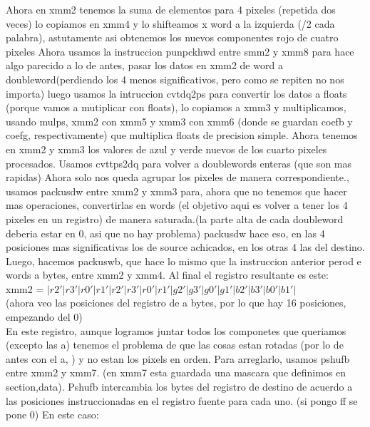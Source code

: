 \documentclass[a4paper]{article}
\begin{document}
   Ahora en xmm2 tenemos la suma de elementos para 4 pixeles (repetida dos veces) lo copiamos en xmm4 y lo shifteamos x word a la izquierda (/2 cada palabra), astutamente asi obtenemos los nuevos componentes rojo de cuatro pixeles\hfill \break
   Ahora usamos la instruccion punpckhwd entre smm2 y xmm8 para hace algo parecido a lo de antes,  pasar los datos en xmm2 de word a doubleword(perdiendo los 4 menos significativos, pero como se repiten no nos importa) luego usamos la intruccion cvtdq2ps para convertir los datos a floats (porque vamos a mutiplicar con floats), lo copiamos a xmm3 y multiplicamos, usando mulps, xmm2 con xmm5 y xmm3 con xmm6 (donde se guardan coefb y coefg, respectivamente) que multiplica floats de precision simple. Ahora tenemos en xmm2 y xmm3 los valores de azul y verde nuevos de los cuarto pixeles procesados. Usamos cvttps2dq para volver a doublewords enteras (que son mas rapidas)\hfill \break
   Ahora solo nos queda agrupar los pixeles de  manera correspondiente., usamos packusdw entre xmm2 y xmm3 para, ahora que no tenemos que hacer mas operaciones, convertirlas en words (el objetivo aqui es volver a tener los 4 pixeles en un registro) de manera saturada.(la parte alta de cada doubleword deberia estar en 0, asi que no hay problema) packusdw hace eso, en las 4 posiciones mas significativas los de source achicados, en los otras 4  las del destino.\hfill \break
   \\
   Luego, hacemos packuswb, que hace lo mismo que la instruccion anterior perod e words a bytes, entre xmm2 y xmm4. Al final el registro resultante es este:
   \hfill \break \\
    xmm2 = $ | r2' | r3' | r0' | r1' | r2' | r3' | r0' | r1' | g2' | g3' | g0' | g1' | b2' | b3' | b0' | b1' | $ \hfill \break
    \\
    (ahora veo las posiciones del registro de a bytes, por lo que hay 16 posiciones, empezando del 0)
    \\
    \hfill \break
    En este registro, aunque logramos juntar todos los componetes que queriamos (excepto las a) tenemos el problema de que las cosas estan rotadas (por lo de antes con el a, ) y no estan los pixels en orden.
    \hfill \break
    	Para arreglarlo, usamos pshufb entre xmm2 y xmm7. (en xmm7 esta guardada una mascara que definimos en section,data). Pshufb intercambia los bytes del registro de destino de acuerdo a las posiciones instruccionadas en el registro fuente para cada uno. (si pongo ff se pone 0)
    	\hfill \break
    	En este caso:
    	\hfill \break
    	
\end{document}
